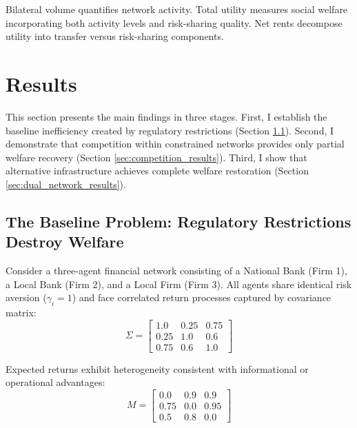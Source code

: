 \documentclass[12pt]{article}
\begin{document}
Bilateral volume quantifies network activity. Total utility measures social welfare incorporating both activity levels and risk-sharing quality. Net rents decompose utility into transfer versus risk-sharing components.



\section{Results}
\label{sec:results}

This section presents the main findings in three stages. First, I establish the baseline inefficiency created by regulatory restrictions (Section \ref{sec:baseline_problem}). Second, I demonstrate that competition within constrained networks provides only partial welfare recovery (Section \ref{sec:competition_results}). Third, I show that alternative infrastructure achieves complete welfare restoration (Section \ref{sec:dual_network_results}).

\subsection{The Baseline Problem: Regulatory Restrictions Destroy Welfare}
\label{sec:baseline_problem}


Consider a three-agent financial network consisting of a National Bank (Firm 1), a Local Bank (Firm 2), and a Local Firm (Firm 3). All agents share identical risk aversion ($\gamma_i = 1$) and face correlated return processes captured by covariance matrix:
\begin{equation}
\Sigma = \begin{bmatrix} 
    1.0 & 0.25 & 0.75 \\ 
    0.25 & 1.0 & 0.6 \\ 
    0.75 & 0.6 & 1.0 
\end{bmatrix}
\end{equation}

Expected returns exhibit heterogeneity consistent with informational or operational advantages:
\begin{equation}
M = \begin{bmatrix} 
    0.0 & 0.9 & 0.9 \\ 
    0.75 & 0.0 & 0.95 \\ 
    0.5 & 0.8 & 0.0 
\end{bmatrix}
\end{equation}
\end{document}
